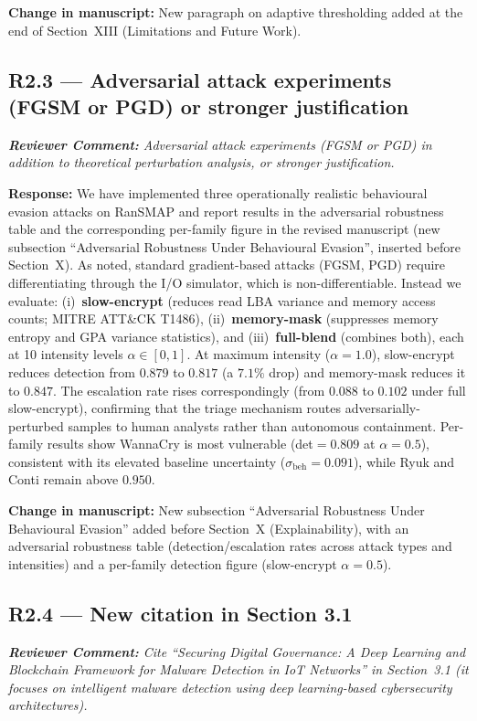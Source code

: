 \documentclass[11pt,a4paper]{article}
\newcommand{\RC}[1]{\begin{reviewbox}\textit{\textbf{Reviewer Comment:} #1}\end{reviewbox}}
\newcommand{\RS}[1]{\noindent\textcolor{responsegreen}{\textbf{Response:}} #1\par\medskip}
\newcommand{\CH}[1]{\noindent\textcolor{changebrown}{\textbf{Change in manuscript:}} #1\par\bigskip}
\begin{document}
\CH{New paragraph on adaptive thresholding added at the end of Section~XIII
(Limitations and Future Work).}

\subsection*{R2.3 --- Adversarial attack experiments (FGSM or PGD) or stronger justification}

\RC{Adversarial attack experiments (FGSM or PGD) in addition to theoretical
perturbation analysis, or stronger justification.}

\RS{We have implemented three operationally realistic behavioural evasion attacks on
RanSMAP and report results in the adversarial robustness table and the corresponding per-family figure
in the revised manuscript (new subsection ``Adversarial Robustness Under Behavioural
Evasion'', inserted before Section~X). As noted, standard gradient-based attacks (FGSM,
PGD) require differentiating through the I/O simulator, which is non-differentiable.
Instead we evaluate: (i)~\textbf{slow-encrypt} (reduces read LBA variance and memory
access counts; MITRE ATT\&CK T1486), (ii)~\textbf{memory-mask} (suppresses memory
entropy and GPA variance statistics), and (iii)~\textbf{full-blend} (combines both),
each at 10 intensity levels $\alpha \in [0, 1]$. At maximum intensity ($\alpha=1.0$),
slow-encrypt reduces detection from $0.879$ to $0.817$ (a $7.1\%$ drop) and
memory-mask reduces it to $0.847$. The escalation rate rises correspondingly (from
$0.088$ to $0.102$ under full slow-encrypt), confirming that the triage mechanism
routes adversarially-perturbed samples to human analysts rather than autonomous
containment. Per-family results show WannaCry is most vulnerable (det$=0.809$ at
$\alpha=0.5$), consistent with its elevated baseline uncertainty
($\sigma_{\mathrm{beh}}=0.091$), while Ryuk and Conti remain above $0.950$.}

\CH{New subsection ``Adversarial Robustness Under Behavioural Evasion'' added before
Section~X (Explainability), with an adversarial robustness table (detection/escalation
rates across attack types and intensities) and a per-family detection figure
(slow-encrypt $\alpha=0.5$).}

\subsection*{R2.4 --- New citation in Section 3.1}

\RC{Cite ``Securing Digital Governance: A Deep Learning and Blockchain Framework for
Malware Detection in IoT Networks'' in Section~3.1 (it focuses on intelligent malware
detection using deep learning-based cybersecurity architectures).}
\end{document}
